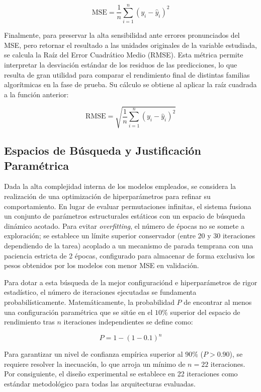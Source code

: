\begin{equation}
	\text{MSE} = \frac{1}{n} \sum_{i=1}^{n} (y_i - \hat{y}_i)^2
\end{equation}

Finalmente, para preservar la alta sensibilidad ante errores pronunciados del MSE, pero retornar el resultado a las unidades originales de la variable estudiada, se calcula la Raíz del Error Cuadrático Medio (RMSE). Esta métrica permite interpretar la desviación estándar de los residuos de las predicciones, lo que resulta de gran utilidad para comparar el rendimiento final de distintas familias algorítmicas en la fase de prueba. Su cálculo se obtiene al aplicar la raíz cuadrada a la función anterior:

\begin{equation}
	\text{RMSE} = \sqrt{\frac{1}{n} \sum_{i=1}^{n} (y_i - \hat{y}_i)^2}
\end{equation}


\subsection{Espacios de Búsqueda y Justificación Paramétrica}
\label{sec:hyperparameters_space}

Dada la alta complejidad interna de los modelos empleados, se considera la realización de una optimización de hiperparámetros para refinar su comportamiento. En lugar de evaluar permutaciones infinitas, el sistema fusiona un conjunto de parámetros estructurales estáticos con un espacio de búsqueda dinámico acotado. Para evitar \textit{overfitting}, el número de épocas no se somete a exploración; se establece un límite superior conservador (entre 20 y 30 iteraciones dependiendo de la tarea) acoplado a un mecanismo de parada temprana con una paciencia estricta de 2 épocas, configurado para almacenar de forma exclusiva los pesos obtenidos por los modelos con menor MSE en validación.

Para dotar a esta búsqueda de la mejor configuraciónd e hiperparámetros de rigor estadístico, el número de iteraciones ejecutadas se fundamenta probabilísticamente. Matemáticamente, la probabilidad $P$ de encontrar al menos una configuración paramétrica que se sitúe en el $10\%$ superior del espacio de rendimiento tras $n$ iteraciones independientes se define como:

$$ P = 1 - (1 - 0.1)^n $$

Para garantizar un nivel de confianza empírica superior al $90\%$ ($P > 0.90$), se requiere resolver la inecuación, lo que arroja un mínimo de $n = 22$ iteraciones. Por consiguiente, el diseño experimental se establece en 22 iteraciones como estándar metodológico para todas las arquitecturas evaluadas. 


